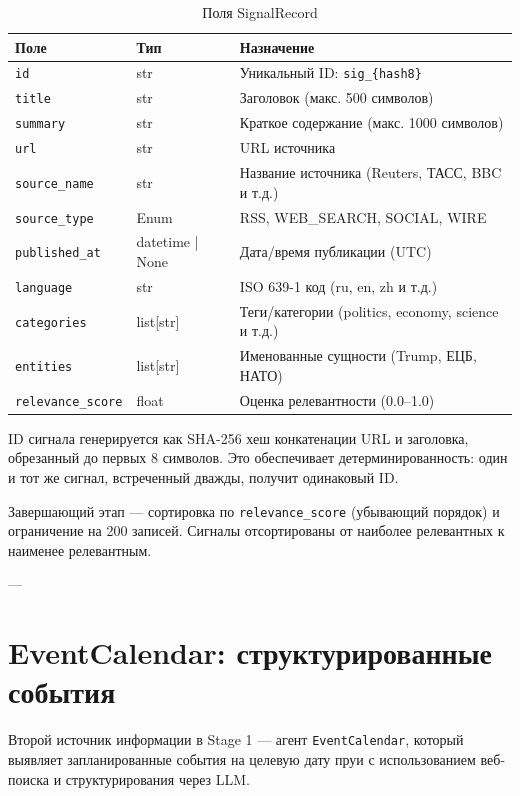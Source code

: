 \begin{table}[h!]
\centering
\caption{Поля SignalRecord}
\label{tab:signal_record}
\small
\begin{tabular}{|l|l|l|}
\hline
\textbf{Поле} & \textbf{Тип} & \textbf{Назначение} \\
\hline
\texttt{id} & str & Уникальный ID: \texttt{sig\_\{hash8\}} \\
\texttt{title} & str & Заголовок (макс. 500 символов) \\
\texttt{summary} & str & Краткое содержание (макс. 1000 символов) \\
\texttt{url} & str & URL источника \\
\texttt{source\_name} & str & Название источника (Reuters, ТАСС, BBC и т.д.) \\
\texttt{source\_type} & Enum & RSS, WEB\_SEARCH, SOCIAL, WIRE \\
\texttt{published\_at} & datetime | None & Дата/время публикации (UTC) \\
\texttt{language} & str & ISO 639-1 код (ru, en, zh и т.д.) \\
\texttt{categories} & list[str] & Теги/категории (politics, economy, science и т.д.) \\
\texttt{entities} & list[str] & Именованные сущности (Trump, ЕЦБ, НАТО) \\
\texttt{relevance\_score} & float & Оценка релевантности (0.0--1.0) \\
\hline
\end{tabular}
\end{table}


ID сигнала генерируется как SHA-256 хеш конкатенации URL и заголовка, обрезанный до первых 8 символов. Это обеспечивает детерминированность: один и тот же сигнал, встреченный дважды, получит одинаковый ID.


Завершающий этап --- сортировка по \texttt{relevance\_score} (убывающий порядок) и ограничение на 200 записей. Сигналы отсортированы от наиболее релевантных к наименее релевантным.

---

\section{EventCalendar: структурированные события}

Второй источник информации в Stage 1 --- агент \texttt{EventCalendar}, который выявляет запланированные события на целевую дату пруи с использованием веб-поиска и структурирования через LLM.

